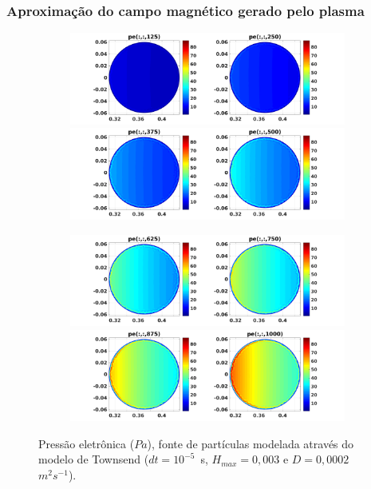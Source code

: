 \documentclass[aspectratio=169]{beamer}
\begin{document}
\begin{frame}	
\frametitle{ Aproximação do campo magnético gerado pelo plasma}
\begin{figure}[H]
\begin{subfigure}{0.43\textwidth}
\includegraphics[scale=0.24]{../SImulacao_breakdown/PDE/petod1B8.png}  
\includegraphics[scale=0.24]{../SImulacao_breakdown/PDE/petod2B8.png}
\end{subfigure}
\begin{subfigure}{0.43\textwidth}
\includegraphics[scale=0.24]{../SImulacao_breakdown/PDE/petod3B8.png} 
\includegraphics[scale=0.24]{../SImulacao_breakdown/PDE/petod4B8.png}
\end{subfigure}	
\caption{Pressão eletrônica ($Pa$), fonte de partículas modelada através do modelo de Townsend ($dt=10^{-5}$\ s, $H_{max} = 0,003$ e $D=0,0002$\ $m^2s^{-1}$).}
\label{campplasmasil3}
\end{figure}
\end{frame}
\end{document}
